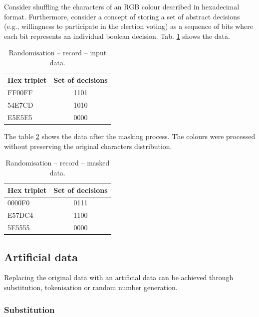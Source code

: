 \documentclass[a4paper,twoside,12pt]{book}
\begin{document}
Consider shuffling the characters of an RGB colour described in hexadecimal format. Furthermore, consider a concept of storing a set of abstract decisions (e.g., willingness to participate in the election voting) as a sequence of bits where each bit represents an individual boolean decision. Tab. \ref{id:tab:record_randomisation_raw} shows the data.

\begin{table}%
\centering
\caption{Randomisation – record – input data.}
\label{id:tab:record_randomisation_raw}
\begin{tabular}{lc}
\toprule
Hex triplet & Set of decisions \\ \midrule
FF00FF      & 1101             \\
54E7CD      & 1010             \\
E5E5E5      & 0000             \\ \bottomrule
\end{tabular}
\end{table}

The table \ref{id:tab:record_randomisation_masked} shows the data after the masking process. The colours were processed without preserving the original characters distribution.

\begin{table}%
\centering
\caption{Randomisation – record – masked data.}
\label{id:tab:record_randomisation_masked}
\begin{tabular}{lc}
\toprule
Hex triplet & Set of decisions \\ \midrule
0000F0      & 0111             \\
E57DC4      & 1100             \\
5E5555      & 0000             \\ \bottomrule
\end{tabular}
\end{table}


\subsection{Artificial data}

Replacing the original data with an artificial data can be achieved through substitution, tokenisation or random number generation.


\subsubsection{Substitution}
\end{document}
